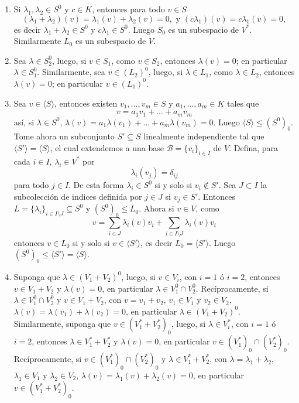 \dem
\begin{enumerate}
\item Si $\lambda_1,\lambda_2\in S^0$ y $c\in K$, entonces para todo $v\in S$
\[
(\lambda_1+\lambda_2)(v)=\lambda_1(v)+\lambda_2(v)=0,\textrm{ y } (c\lambda_1)(v)=c\lambda_1(v)=0, 
\]
es decir $\lambda_1+\lambda_2\in S^0$ y $c\lambda_1\in S^0$. Luego $S_0$ es un subespacio de $V^*$. Similarmente $L_0$ es un subespacio de $V$.
\item Sea $\lambda\in S_2^0$, luego, si $v\in S_1$, como $v\in S_2$, entonces $\lambda(v)=0$; en particular $\lambda\in S_1^0$. Similarmente, sea $v\in\left(L_2\right)^0$, luego, si $\lambda\in L_1$, como $\lambda\in L_2$, entonces $\lambda(v)=0$; en particular $v\in\left(L_1\right)^0$.
\item Sea $v\in\langle S\rangle$, entonces existen $v_1,\ldots,v_m\in S$ y $a_1,\ldots,a_m\in K$ tales que
\[
v=a_1v_1+\ldots+a_mv_m
\]
as\'i, si $\lambda\in S^0$, $\lambda(v)=a_1\lambda(v_1)+\ldots+a_m\lambda(v_m)=0$. Luego $\langle S\rangle\le \left(S^0\right)_0$.\\
Tome ahora un subconjunto $S'\subseteq S$ linealmente independiente tal que $\langle S'\rangle=\langle S\rangle$, el cual extendemos a una base $\mathcal{B}=\{v_i\}_{i\in I}$ de $V$. Defina, para cada $i\in I$, $\lambda_i\in V^*$ por
\[
\lambda_i(v_j)=\delta_{ij}
\]
para todo $j\in I$. De esta forma $\lambda_i\in S^0$ si y solo si $v_i\not\in S'$. Sea $J\subset I$ la subcolecci\'on de indices definida por $j\in J$ si $v_j\in S'$. Entonces $L=\{\lambda_i\}_{i\in I\setminus J}\subseteq S^0$ y $\left(S^0\right)_0\le L_0$. Ahora si $v\in V$, como
\[
v=\sum_{i\in J}\lambda_i(v)v_i+\sum_{i\in I\setminus J}\lambda_i(v)v_i
\] 
entonces $v\in L_0$ si y solo si $v\in\langle S'\rangle$, es decir $L_0=\langle S'\rangle$. Luego $\left(S^0\right)_0\le\langle S'\rangle=\langle S\rangle$.
\item Suponga que $\lambda\in (V_1+V_2)^0$, luego, si $v\in V_i$, con $i=1$ \'o $i=2$, entonces $v\in V_1+V_2$ y $\lambda(v)=0$, en particular $\lambda\in V_1^0\cap V_2^0$. Rec\'iprocamente, si $\lambda\in V_1^0\cap V_2^0$ y $v\in V_1+V_2$, con $v=v_1+v_2$, $v_1\in V_1$ y $v_2\in V_2$, $\lambda(v)=\lambda(v_1)+\lambda(v_2)=0$, en particular $\lambda\in (V_1+V_2)^0$.\\
Similarmente, suponga que $v\in\left(V_1^*+V_2^*\right)_0$, luego, si $\lambda\in V_i^*$, con $i=1$ \'o $i=2$, entonces $\lambda\in V_1^*+V_2^*$ y $\lambda(v)=0$, en particular $v\in \left(V_1^*\right)_0\cap \left(V_2^*\right)_0$. Rec\'iprocamente, si $v\in \left(V_1^*\right)_0\cap \left(V_2^*\right)_0$ y $\lambda\in V_1^*+V_2^*$, con $\lambda=\lambda_1+\lambda_2$, $\lambda_1\in V_1$ y $\lambda_2\in V_2$, $\lambda(v)=\lambda_1(v)+\lambda_2(v)=0$, en particular $v\in \left(V_1^*+V_2^*\right)_0$.

\end{enumerate}
